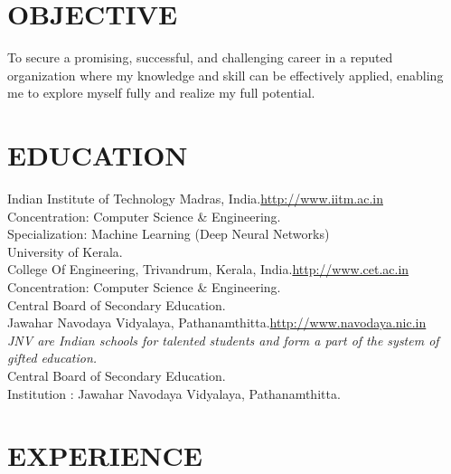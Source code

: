 \documentclass[11pt, a4paper, sans]{moderncv}
\begin{document}
\maketitle

\section{OBJECTIVE}
To secure a promising, successful, and challenging career in a reputed organization where my knowledge and skill can be effectively applied, enabling me to explore myself fully and realize my full potential.\\


\section{EDUCATION}
{
Indian Institute of Technology Madras, India.\hfill \url{http://www.iitm.ac.in}\\
Concentration: Computer Science \& Engineering.\\
Specialization: Machine Learning (Deep Neural Networks)\\
}
{
University of Kerala.\\
College Of Engineering, Trivandrum, Kerala, India.\hfill\url{http://www.cet.ac.in}\\
Concentration: Computer Science \& Engineering.\\
}
{
Central Board of Secondary Education.\\
Jawahar Navodaya Vidyalaya, Pathanamthitta.\hfill \url{http://www.navodaya.nic.in}\\
\textit{JNV are Indian schools for talented students and form a part of the system of gifted education.}\\
}
{
Central Board of Secondary Education.\\
Institution : Jawahar Navodaya Vidyalaya, Pathanamthitta. \\
}

\section{EXPERIENCE}
\end{document}

